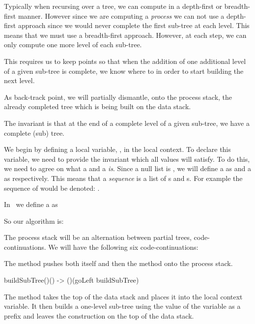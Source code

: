 Typically when recursing over a tree, we can compute in a depth-first or 
breadth-first manner. However since we are computing a \emph{process} we 
can not use a depth-first approach since we would never complete the first 
sub-tree at each level. This means that we must use a breadth-first 
approach. However, at each step, we can only compute one more level of 
each sub-tree. 

This requires us to keep  points so that when the 
addition of one additional level of a given sub-tree is complete, we know 
where to  in order to start building the next level. 

As back-track point, we will partially dismantle, onto the process stack, 
the already completed tree which is being built on the data stack. 

The invariant is that at the end of a complete level of a given sub-tree, 
we have a complete (sub) tree. 

We begin by defining a local variable, , in the local context. 
To declare this variable, we need to provide the invariant which all 
values will satisfy. To do this, we need to agree on what a  
and a  \emph{is}. Since a null list is \type{()}, we will 
define a  as \type{(())} and a  as \type{(()())} 
respectively. This means that a  \emph{sequence} is a list 
of s and s. For example the sequence of 
 would be denoted: \type{( (()) (()()) (()) (()()) (()()) 
(()) )}. 

In \joylol\ we define a  as 

\starttyping
\startJoylolCode

\stopJoylolCode
\stoptyping

So our algorithm is:

The process stack will be an alternation between partial trees, 
code-continuations. We will have the following six code-continuations:

\startitemize

\item The  method pushes both itself and then the 
 method onto the process stack. 

\starttyping
\startJoylolCode
buildSubTree()() -> ()(goLeft buildSubTree)
\stopJoylolCode
\stoptyping

\item The  method takes the top of the data stack and 
places it into the  local context variable. It then builds a 
one-level sub-tree using the value of the  variable as a prefix 
and leaves the construction on the top of the data stack. 

